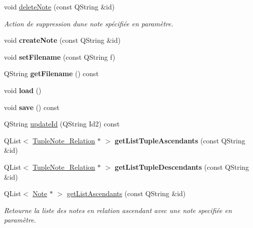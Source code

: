 \begin{DoxyCompactItemize}
void \hyperlink{class_notes_manager_a989429244c36c35ef68204f6ae2a0a5f}{delete\+Note} (const Q\+String \&id)
\begin{DoxyCompactList}\small\item\em Action de suppression d\textquotesingle{}une note spécifiée en paramètre. \end{DoxyCompactList}\item 
\mbox{\label{class_notes_manager_a5a47d17ce4add155db4715f027a7ea4f}} 
void {\bfseries create\+Note} (const Q\+String \&id)
\item 
\mbox{\label{class_notes_manager_a797d858176de3f5e64aa8194797909fb}} 
void {\bfseries set\+Filename} (const Q\+String f)
\item 
\mbox{\label{class_notes_manager_a566cbb0dd7b606ec34629a2aa8010b73}} 
Q\+String {\bfseries get\+Filename} () const
\item 
\mbox{\label{class_notes_manager_ad4fb2de50633dd25b71024343341cd64}} 
void {\bfseries load} ()
\item 
\mbox{\label{class_notes_manager_ad271bd7f8079b01b04a32b886b498bac}} 
void {\bfseries save} () const
\item 
Q\+String \hyperlink{class_notes_manager_a2a8aba4f2f40239fce1b541a10b92a7e}{update\+Id} (Q\+String Id2) const
\item 
\mbox{\label{class_notes_manager_a9f2c72d67d67c89a61f77a9b1a0ae390}} 
Q\+List$<$ \hyperlink{class_tuple_note___relation}{Tuple\+Note\+\_\+\+Relation} $\ast$ $>$ {\bfseries get\+List\+Tuple\+Ascendants} (const Q\+String \&id)
\item 
\mbox{\label{class_notes_manager_a4b8636fd8bc9d750d778585d3e4372cf}} 
Q\+List$<$ \hyperlink{class_tuple_note___relation}{Tuple\+Note\+\_\+\+Relation} $\ast$ $>$ {\bfseries get\+List\+Tuple\+Descendants} (const Q\+String \&id)
\item 
Q\+List$<$ \hyperlink{class_note}{Note} $\ast$ $>$ \hyperlink{class_notes_manager_ac85019776c1e8653665e24abc9d8001d}{get\+List\+Ascendants} (const Q\+String \&id)
\begin{DoxyCompactList}\small\item\em Retourne la liste des notes en relation ascendant avec une note specifiée en paramètre. \end{DoxyCompactList}\item 

\end{DoxyCompactItemize}
